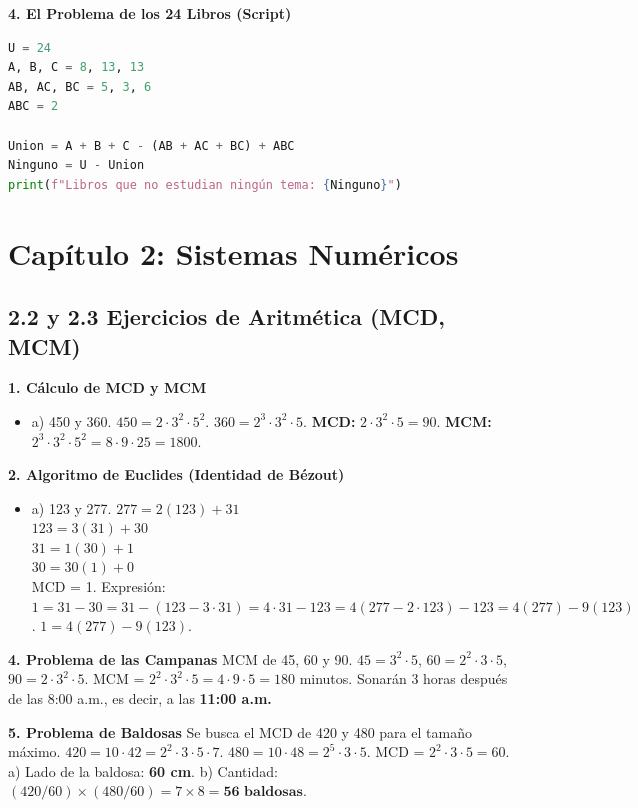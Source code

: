 \documentclass[letterpaper, 12pt]{article}
\begin{document}
\textbf{4. El Problema de los 24 Libros (Script)}
\begin{lstlisting}[language=Python]
U = 24
A, B, C = 8, 13, 13
AB, AC, BC = 5, 3, 6
ABC = 2

Union = A + B + C - (AB + AC + BC) + ABC
Ninguno = U - Union
print(f"Libros que no estudian ningún tema: {Ninguno}")
\end{lstlisting}

\newpage
\section{Capítulo 2: Sistemas Numéricos}

\subsection{2.2 y 2.3 Ejercicios de Aritmética (MCD, MCM)}

\textbf{1. Cálculo de MCD y MCM}
\begin{itemize}
    \item a) 450 y 360.
    $450 = 2 \cdot 3^2 \cdot 5^2$. $360 = 2^3 \cdot 3^2 \cdot 5$.
    \textbf{MCD:} $2 \cdot 3^2 \cdot 5 = 90$.
    \textbf{MCM:} $2^3 \cdot 3^2 \cdot 5^2 = 8 \cdot 9 \cdot 25 = 1800$.
\end{itemize}

\textbf{2. Algoritmo de Euclides (Identidad de Bézout)}
\begin{itemize}
    \item a) 123 y 277.
    $277 = 2(123) + 31$ \\
    $123 = 3(31) + 30$ \\
    $31 = 1(30) + 1$ \\
    $30 = 30(1) + 0$ \\
    MCD = 1. Expresión: $1 = 31 - 30 = 31 - (123 - 3\cdot 31) = 4\cdot 31 - 123 = 4(277 - 2\cdot 123) - 123 = 4(277) - 9(123)$.
    $1 = 4(277) - 9(123)$.
\end{itemize}

\textbf{4. Problema de las Campanas}
MCM de 45, 60 y 90.
$45=3^2 \cdot 5$, $60=2^2 \cdot 3 \cdot 5$, $90=2 \cdot 3^2 \cdot 5$.
MCM = $2^2 \cdot 3^2 \cdot 5 = 4 \cdot 9 \cdot 5 = 180$ minutos.
Sonarán 3 horas después de las 8:00 a.m., es decir, a las \textbf{11:00 a.m.}

\textbf{5. Problema de Baldosas}
Se busca el MCD de 420 y 480 para el tamaño máximo.
$420 = 10 \cdot 42 = 2^2 \cdot 3 \cdot 5 \cdot 7$.
$480 = 10 \cdot 48 = 2^5 \cdot 3 \cdot 5$.
MCD = $2^2 \cdot 3 \cdot 5 = 60$.
a) Lado de la baldosa: \textbf{60 cm}.
b) Cantidad: $(420/60) \times (480/60) = 7 \times 8 = \textbf{56 baldosas}$.
\end{document}
